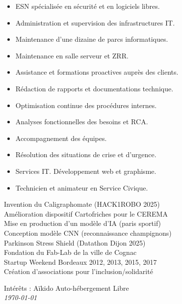 \documentclass[10pt,a4paper,ragged2e,withhyper,normalphoto]{altacv}
\begin{document}
\begin{paracol}{2}
\switchcolumn

\begin{itemize}
\item ESN spécialisée en sécurité et en logiciels libres.
\item Administration et supervision des infrastructures IT.
\item Maintenance d’une dizaine de parcs informatiques.
\item Maintenance en salle serveur et ZRR.
\item Assistance et formations proactives auprès des clients.
\item Rédaction de rapports et documentations technique.
\item Optimisation continue des procédures internes.
\item Analyses fonctionnelles des besoins et RCA.
\item Accompagnement des équipes.
\item Résolution des situations de crise et d’urgence.
\end{itemize}
\divider
{}
\begin{itemize}
\item Services IT. Développement web et graphisme.
\end{itemize}
\divider
{}
\begin{itemize}
\item Technicien et animateur en Service Civique.
\end{itemize}

{\faRobot}{Invention du Caligraphomate (HACK1ROBO 2025)}\\
{\faChartLine}{Amélioration dispositif Cartofriches pour le CEREMA}\\
{\faCogs}{Mise en production d'un modèle d'IA (paris sportif)}\\
{\faEye}{Conception modèle CNN (reconnaissance champignons)}\\
{\faMedkit}{Parkinson Stress Shield (Datathon Dijon 2025)}\\
{\faLightbulb}{Fondation du Fab-Lab de la ville de Cognac}\\
{\faFlask}{Startup Weekend Bordeaux 2012, 2013, 2015, 2017}\\
{\faHandHoldingHeart}{Création d'associations pour l'inclusion/solidarité}

\divider

Intérêts : {\faUserNinja} Aïkido {\faServer} Auto-hébergement {\faLinux} Libre\\

\raggedleft
\bigskip
\bigskip
{\textit{\today}}
\end{paracol}
\end{document}
